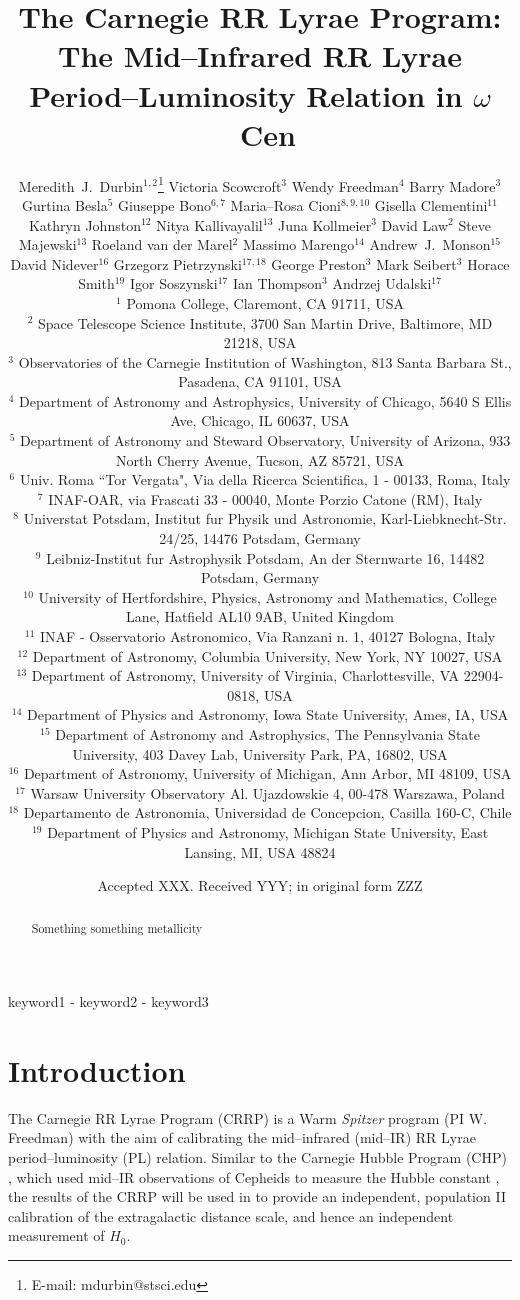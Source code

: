 \documentclass[a4paper,fleqn,usenatbib]{mnras}
\title[Mid--IR RR Lyrae PL Relation in $\omega$ Cen]{The Carnegie RR Lyrae Program: The Mid--Infrared RR Lyrae Period--Luminosity Relation in $\omega$~Cen}
\author[M.~J.~Durbin et al.]{Meredith~J.~Durbin$^{1,2}$\thanks{E-mail: mdurbin@stsci.edu}
Victoria Scowcroft$^{3}$
Wendy Freedman$^{4}$
Barry Madore$^{3}$
\newauthor Gurtina Besla$^{5}$ 
Giuseppe Bono$^{6, 7}$
Maria--Rosa Cioni$^{8, 9, 10}$
Gisella Clementini$^{11}$
\newauthor Kathryn Johnston$^{12}$
Nitya Kallivayalil$^{13}$
Juna Kollmeier$^{3}$
David Law$^{2}$
Steve Majewski$^{13}$
\newauthor Roeland van der Marel$^{2}$
Massimo Marengo$^{14}$
Andrew~J.~Monson$^{15}$
David Nidever$^{16}$ 
\newauthor
Grzegorz Pietrzynski$^{17, 18}$
George Preston$^{3}$
Mark Seibert$^{3}$
Horace Smith$^{19}$
\newauthor Igor Soszynski$^{17}$
Ian Thompson$^{3}$
Andrzej Udalski$^{17}$
\\
$^1$ Pomona College, Claremont, CA 91711, USA \\
$^2$ Space Telescope Science Institute, 3700 San Martin Drive, Baltimore, MD 21218, USA \\
$^3$ Observatories of the Carnegie Institution of Washington, 813 Santa Barbara St., Pasadena, CA 91101, USA \\
$^4$ Department of Astronomy and Astrophysics, University of Chicago, 5640 S Ellis Ave, Chicago, IL 60637, USA \\
$^5$ Department of Astronomy and Steward Observatory, University of Arizona, 933 North Cherry Avenue,   Tucson, AZ 85721, USA \\
$^6$ Univ. Roma ``Tor Vergata", Via della Ricerca Scientifica, 1 - 00133, Roma, Italy \\
$^7$ INAF-OAR, via Frascati 33 - 00040, Monte Porzio Catone (RM), Italy \\
$^8$ Universtat Potsdam, Institut fur Physik und Astronomie, Karl-Liebknecht-Str. 24/25, 14476 Potsdam, Germany \\
$^9$ Leibniz-Institut fur Astrophysik Potsdam, An der Sternwarte 16, 14482 Potsdam, Germany \\
$^{10}$ University of Hertfordshire, Physics, Astronomy and Mathematics, College Lane, Hatfield AL10 9AB, United Kingdom \\
$^{11}$ INAF - Osservatorio Astronomico, Via Ranzani n. 1, 40127 Bologna, Italy \\
$^{12}$ Department of Astronomy, Columbia University, New York, NY 10027, USA  \\
$^{13}$ Department of Astronomy, University of Virginia, Charlottesville, VA 22904-0818, USA \\
$^{14}$ Department of Physics and Astronomy, Iowa State University, Ames, IA, USA \\
$^{15}$ Department of Astronomy and Astrophysics, The Pennsylvania State University, 403 Davey Lab, University Park, PA, 16802, USA \\
$^{16}$ Department of Astronomy, University of Michigan, Ann Arbor, MI 48109, USA \\
$^{17}$ Warsaw University Observatory Al. Ujazdowskie 4, 00-478 Warszawa, Poland \\
$^{18}$ Departamento de Astronomia, Universidad de Concepcion, Casilla 160-C, Chile \\
$^{19}$ Department of Physics and Astronomy, Michigan State University, East Lansing, MI, USA 48824 \\
}
\date{Accepted XXX. Received YYY; in original form ZZZ}
\begin{document}
\label{firstpage}
\pagerange{\pageref{firstpage}-\pageref{lastpage}}
\maketitle

\begin{abstract}
Something something metallicity
\end{abstract}

\begin{keywords}
keyword1 - keyword2 - keyword3
\end{keywords}






\section{Introduction}
\label{sec:intro}

The Carnegie RR Lyrae Program (CRRP) is a Warm {\it Spitzer} program (PI W. Freedman) with the aim of calibrating the mid--infrared (mid--IR) RR Lyrae period--luminosity (PL) relation. Similar to the Carnegie Hubble Program (CHP) \citep{2011AJ....142..192F}, which used mid--IR observations of Cepheids to measure the Hubble constant \citep[$H_{0}$][]{2012ApJ...758...24F}, the results of the CRRP will be used in to provide an independent, population II calibration of the extragalactic distance scale, and hence an independent measurement of $H_{0}$. 
\end{document}
